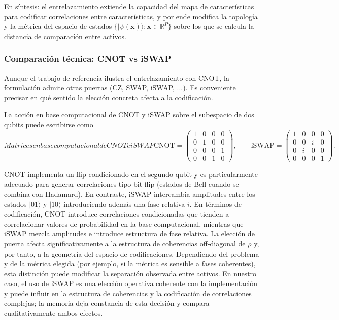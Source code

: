 En síntesis: el entrelazamiento extiende la capacidad del mapa de características para codificar correlaciones entre características, y por ende modifica la topología y la métrica del espacio de estados $\{\lvert\psi(\mathbf{x})\rangle : \mathbf{x}\in\mathbb{R}^P\}$ sobre los que se calcula la distancia de comparación entre activos.

\subsubsection{Comparación técnica: CNOT vs iSWAP}

Aunque el trabajo de referencia ilustra el entrelazamiento con CNOT, la formulación admite otras puertas (CZ, SWAP, iSWAP, ...). Es conveniente precisar en qué sentido la elección concreta afecta a la codificación.

La acción en base computacional de CNOT y iSWAP sobre el subespacio de dos qubits puede escribirse como
\begin{equation}[eq:matrices_cnot_iswap]{Matrices en base computacional de CNOT e iSWAP}
\mathrm{CNOT} = \begin{pmatrix}1&0&0&0\\0&1&0&0\\0&0&0&1\\0&0&1&0\end{pmatrix},
\qquad
\mathrm{iSWAP} = \begin{pmatrix}1&0&0&0\\0&0&i&0\\0&i&0&0\\0&0&0&1\end{pmatrix}.
\end{equation}

CNOT implementa un flip condicionado en el segundo qubit y es particularmente adecuado para generar correlaciones tipo bit-flip (estados de Bell cuando se combina con Hadamard). En contraste, iSWAP intercambia amplitudes entre los estados $\lvert 01\rangle$ y $\lvert 10\rangle$ introduciendo además una fase relativa $i$. En términos de codificación, CNOT introduce correlaciones condicionadas que tienden a correlacionar valores de probabilidad en la base computacional, mientras que iSWAP mezcla amplitudes e introduce estructura de fase relativa. La elección de puerta afecta significativamente a la estructura de coherencias off-diagonal de $\rho$ y, por tanto, a la geometría del espacio de codificaciones. Dependiendo del problema y de la métrica elegida (por ejemplo, si la métrica es sensible a fases coherentes), esta distinción puede modificar la separación observada entre activos. En nuestro caso, el uso de iSWAP es una elección operativa coherente con la implementación y puede influir en la estructura de coherencias y la codificación de correlaciones complejas; la memoria deja constancia de esta decisión y compara cualitativamente ambos efectos.

